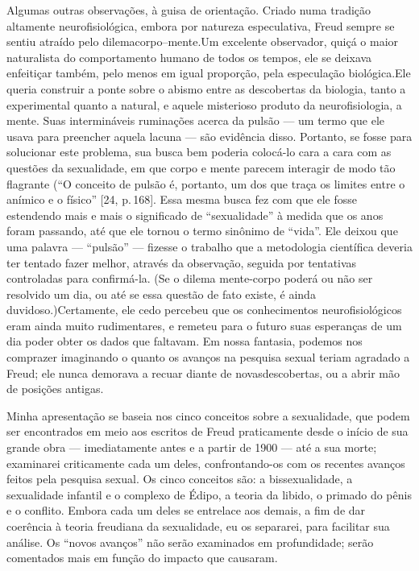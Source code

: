  Algumas outras observações, à guisa de orientação. Criado numa tradição
altamente neurofisiológica, embora por natureza especulativa, Freud
sempre se sentiu atraído pelo dilema\idxquest[|(] corpo--mente.\idxfreudmente[|(] Um excelente
observador, quiçá o maior naturalista do comportamento humano de todos
os tempos, ele se deixava enfeitiçar também, pelo menos em igual
proporção, pela especulação biológica.\idxfreudbiolo[|(] Ele queria construir a ponte
sobre o abismo entre as descobertas da biologia, tanto a experimental
quanto a natural, e aquele misterioso produto da neurofisiologia, a
mente. Suas intermináveis ruminações acerca da pulsão --- um termo que
ele usava para preencher aquela lacuna --- são evidência disso.
Portanto, se fosse para solucionar este problema, sua busca bem
poderia colocá-lo cara a cara com as questões da sexualidade, em que
corpo e mente parecem interagir de modo tão flagrante (``O
conceito de pulsão é, portanto, um dos que traça os limites entre o
anímico e o físico'' [24, p.\,168]. Essa mesma busca fez
com que ele fosse estendendo mais e mais o significado de
``sexualidade'' à medida que os anos foram
passando, até que ele tornou o termo sinônimo de
``vida''. Ele deixou que uma palavra ---
``pulsão'' --- fizesse o trabalho que a
metodologia científica deveria ter tentado fazer melhor, através da
observação, seguida por tentativas controladas para confirmá-la. (Se o
dilema mente-corpo poderá ou não ser resolvido um dia, ou até se essa
questão de fato existe, é ainda duvidoso.)\idxfreudmente[|)] Certamente, ele cedo
percebeu que os conhecimentos neurofisiológicos eram ainda muito
rudimentares, e remeteu para o futuro suas esperanças de um dia poder
obter os dados que faltavam. Em nossa fantasia, podemos nos comprazer
imaginando o quanto os avanços na pesquisa sexual teriam agradado a
Freud; ele nunca demorava a recuar diante de novas\idxquest[|)] descobertas, ou a
abrir mão de posições antigas.

 Minha apresentação se baseia nos cinco conceitos sobre a sexualidade,
que podem ser encontrados em meio aos escritos de Freud praticamente
desde o início de sua grande obra --- imediatamente antes e a partir de
1900 --- até a sua morte; examinarei criticamente cada um deles,
confrontando-os com os recentes avanços feitos pela pesquisa sexual. Os
cinco conceitos são: a bissexualidade,\idxbisse{} a\idxsexui{} sexualidade infantil\idxinfansexua{} e o
complexo de Édipo,\idxconfe{} a teoria da libido,\idxlibid{} o primado\idxpenisprim{} do pênis e o conflito.\idxconf{} Embora cada um deles se entrelace aos demais, a fim de dar coerência à
teoria freudiana da sexualidade, eu os separarei, para facilitar sua
análise. Os ``novos avanços'' não serão
examinados em profundidade; serão comentados mais em função do impacto
que causaram.


